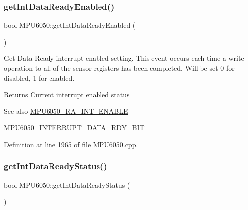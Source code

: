 \subsubsection{\texorpdfstring{getIntDataReadyEnabled()}{getIntDataReadyEnabled()}}
{\footnotesize\ttfamily bool M\+P\+U6050\+::get\+Int\+Data\+Ready\+Enabled (\begin{DoxyParamCaption}{ }\end{DoxyParamCaption})}

Get Data Ready interrupt enabled setting. This event occurs each time a write operation to all of the sensor registers has been completed. Will be set 0 for disabled, 1 for enabled. \begin{DoxyReturn}{Returns}
Current interrupt enabled status 
\end{DoxyReturn}
\begin{DoxySeeAlso}{See also}
\mbox{\hyperlink{MPU6050_8h_a1de9d9557aa7420c746721999df4a377}{M\+P\+U6050\+\_\+\+R\+A\+\_\+\+I\+N\+T\+\_\+\+E\+N\+A\+B\+LE}} 

\mbox{\hyperlink{MPU6050_8h_af58fafd4db7755e66e0beab54e88c41d}{M\+P\+U6050\+\_\+\+I\+N\+T\+E\+R\+R\+U\+P\+T\+\_\+\+D\+A\+T\+A\+\_\+\+R\+D\+Y\+\_\+\+B\+IT}} 
\end{DoxySeeAlso}


Definition at line 1965 of file M\+P\+U6050.\+cpp.


\begin{DoxyCode}{0}

\end{DoxyCode}
\mbox{\label{classMPU6050_ae4f434eb51a15b536e2e8f89a776872b}} 
\subsubsection{\texorpdfstring{getIntDataReadyStatus()}{getIntDataReadyStatus()}}
{\footnotesize\ttfamily bool M\+P\+U6050\+::get\+Int\+Data\+Ready\+Status (\begin{DoxyParamCaption}{ }\end{DoxyParamCaption})}

